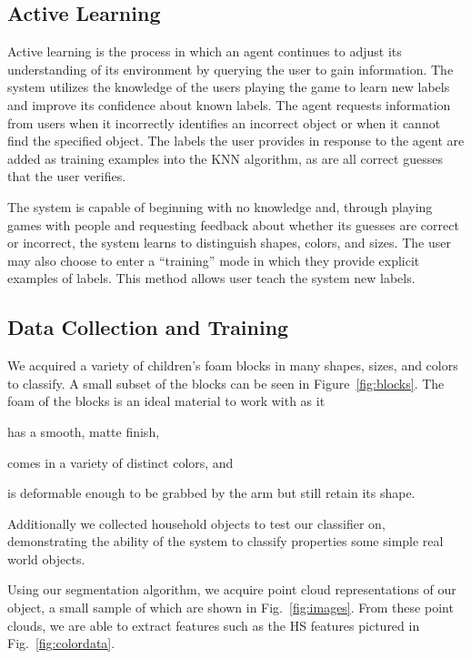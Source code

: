 \documentclass[11pt]{article}
\begin{document}
\subsection{Active Learning}
Active learning is the process in which an agent continues to adjust its
understanding of its environment by querying the user to gain information.
The system utilizes the knowledge of the users playing the game
to learn new labels and improve its confidence about known labels. The agent
requests information from users when it incorrectly identifies an
incorrect object or when it cannot find the specified object. The labels the
user provides in response to the agent are added as training examples into the
KNN algorithm, as are all correct guesses that the user verifies.

The system is capable of beginning with no knowledge and, through playing games
with people and requesting feedback about whether its guesses are correct or
incorrect, the system learns to distinguish shapes, colors, and sizes. The
user may also choose to enter a ``training'' mode in which they provide
explicit examples of labels. This method allows user teach the system new labels.


\subsection{Data Collection and Training}
We acquired a variety of children's foam blocks in many shapes, sizes,
and colors to classify. A small subset of the
blocks can be seen in Figure~\ref{fig:blocks}. The foam of the blocks is an
ideal material to work with as it
\begin{inparaenum}[(1)]
\item has a smooth, matte finish,
\item comes in a variety of distinct colors, and
\item is deformable enough to be grabbed by the arm but still retain its
shape.
\end{inparaenum}
Additionally we collected household objects to test our classifier on,
demonstrating the ability of the system to classify properties some simple
real world objects.

Using our segmentation algorithm, we acquire point cloud representations of
our object, a small sample of which are shown in Fig.~\ref{fig:images}. From
these point clouds, we are able to extract features such as the HS features
pictured in Fig.~\ref{fig:colordata}.
\end{document}
